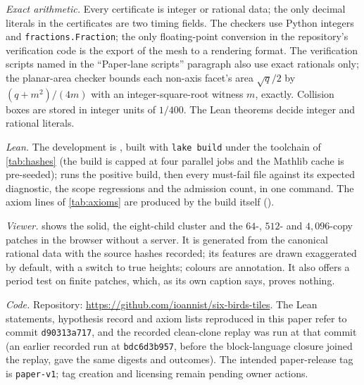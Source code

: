 \emph{Exact arithmetic.} Every certificate is integer or rational data; the only decimal literals
in the certificates are two timing fields. The checkers use Python integers and
\texttt{fractions.Fraction}; the only floating-point conversion in the repository's verification
code is the export of the mesh to a rendering format. The verification scripts named in the ``Paper-lane scripts'' paragraph
also use exact rationals only; the planar-area checker bounds each non-axis facet's
area $\sqrt q/2$ by $(q+m^2)/(4m)$ with an integer-square-root witness $m$, exactly. Collision
boxes are stored in integer units of $1/400$. The Lean theorems decide integer and rational
literals.

\emph{Lean.} The development is , built with \texttt{lake build} under the
toolchain of \cref{tab:hashes} (the build is capped at four parallel jobs and the Mathlib cache is
pre-seeded);  runs the positive build, then every must-fail
file against its expected diagnostic, the scope regressions and the admission count, in one
command. The axiom lines of \cref{tab:axioms} are produced by the build itself
().

\emph{Viewer.}  shows the solid, the eight-child cluster and the
$64$-, $512$- and $4{,}096$-copy patches in the browser without a server. It
is generated from the canonical rational data with the source hashes recorded; its features are
drawn exaggerated by default, with a switch to true heights; colours are annotation. It also
offers a period test on finite patches, which, as its own caption says, proves nothing.


\emph{Code.} Repository: \url{https://github.com/ioannist/six-birds-tiles}. The Lean statements,
hypothesis record and axiom lists reproduced in this paper refer to commit
\texttt{d90313a717}, and the recorded clean-clone replay was run at that commit (an earlier
recorded run at \texttt{bdc6d3b957}, before the block-language closure joined the replay, gave
the same digests and outcomes). The intended paper-release tag is \texttt{paper-v1};
tag creation and licensing remain pending owner actions.
